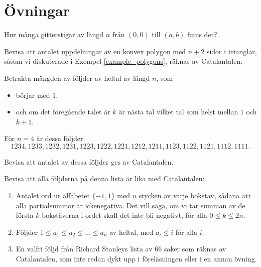 \documentclass{tufte-handout}
\begin{document}
\newpage

\section{Övningar}

\begin{xca}
    Hur många gitterstigar av längd $n$ från $(0,0)$ till $(a,b)$ finns det?
\end{xca}

\begin{xca}
    Bevisa att antalet uppdelningar av en konvex polygon med $n+2$ sidor i trianglar, såsom vi diskuterade i Exempel \ref{example_polygons}, räknas av Catalantalen.
\end{xca}

\begin{xca}
    Betrakta mängden av följder av heltal av längd $n$, som
    \begin{itemize}
        \item börjar med $1$,
        \item och om det föregående talet är $k$ är nästa tal vilket tal som helst mellan $1$ och $k+1$.
    \end{itemize} 

    För $n = 4$ är dessa följder
    $$1234, 1233, 1232, 1231, 1223, 1222, 1221, 1212, 1211, 1123, 1122, 1121, 1112, 1111.$$

    Bevisa att antalet av dessa följder ges av Catalantalen.
\end{xca}

\begin{xca}
    Bevisa att alla följderna på denna lista är lika med Catalantalen:
    \begin{enumerate}
        \item Antalet ord ur alfabetet $\{-1, 1\}$ med $n$ stycken av varje bokstav, sådana att alla partialsummor är ickenegativa. Det vill säga, om vi tar summan av de första $k$ bokstäverna i ordet skall det inte bli negativt, för alla $0 \leq k \leq 2n$.
        \item Följder $1 \leq a_1 \leq a_2 \leq \ldots \leq a_n$ av heltal, med $a_i \leq i$ för alla $i$.
        \item En valfri följd från Richard Stanleys lista av 66 saker som räknas av Catalantalen, som inte redan dykt upp i föreläsningen eller i en annan övning.
    \end{enumerate}
\end{xca}
\end{document}
